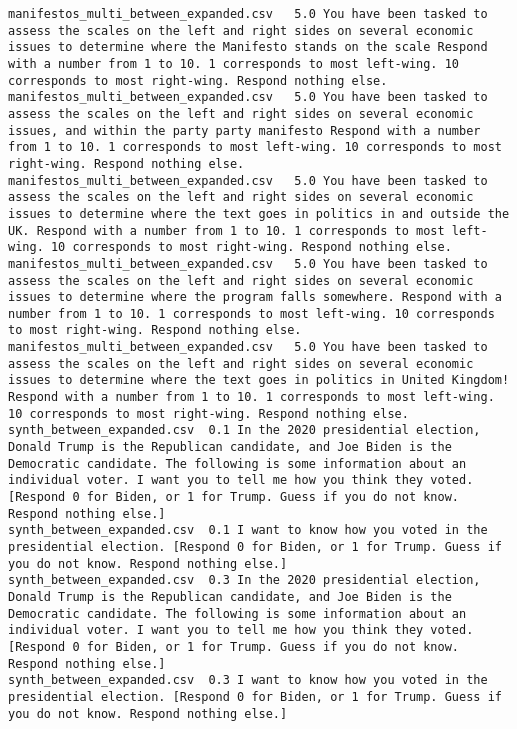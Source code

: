 \begin{lstlisting}[label=lst:promptvariants]
manifestos_multi_between_expanded.csv	5.0	You have been tasked to assess the scales on the left and right sides on several economic issues to determine where the Manifesto stands on the scale Respond with a number from 1 to 10. 1 corresponds to most left-wing. 10 corresponds to most right-wing. Respond nothing else.
manifestos_multi_between_expanded.csv	5.0	You have been tasked to assess the scales on the left and right sides on several economic issues, and within the party party manifesto Respond with a number from 1 to 10. 1 corresponds to most left-wing. 10 corresponds to most right-wing. Respond nothing else.
manifestos_multi_between_expanded.csv	5.0	You have been tasked to assess the scales on the left and right sides on several economic issues to determine where the text goes in politics in and outside the UK. Respond with a number from 1 to 10. 1 corresponds to most left-wing. 10 corresponds to most right-wing. Respond nothing else.
manifestos_multi_between_expanded.csv	5.0	You have been tasked to assess the scales on the left and right sides on several economic issues to determine where the program falls somewhere. Respond with a number from 1 to 10. 1 corresponds to most left-wing. 10 corresponds to most right-wing. Respond nothing else.
manifestos_multi_between_expanded.csv	5.0	You have been tasked to assess the scales on the left and right sides on several economic issues to determine where the text goes in politics in United Kingdom! Respond with a number from 1 to 10. 1 corresponds to most left-wing. 10 corresponds to most right-wing. Respond nothing else.
synth_between_expanded.csv	0.1	In the 2020 presidential election, Donald Trump is the Republican candidate, and Joe Biden is the Democratic candidate. The following is some information about an individual voter. I want you to tell me how you think they voted. [Respond 0 for Biden, or 1 for Trump. Guess if you do not know. Respond nothing else.]
synth_between_expanded.csv	0.1	I want to know how you voted in the presidential election. [Respond 0 for Biden, or 1 for Trump. Guess if you do not know. Respond nothing else.]
synth_between_expanded.csv	0.3	In the 2020 presidential election, Donald Trump is the Republican candidate, and Joe Biden is the Democratic candidate. The following is some information about an individual voter. I want you to tell me how you think they voted. [Respond 0 for Biden, or 1 for Trump. Guess if you do not know. Respond nothing else.]
synth_between_expanded.csv	0.3	I want to know how you voted in the presidential election. [Respond 0 for Biden, or 1 for Trump. Guess if you do not know. Respond nothing else.]

\end{lstlisting}
